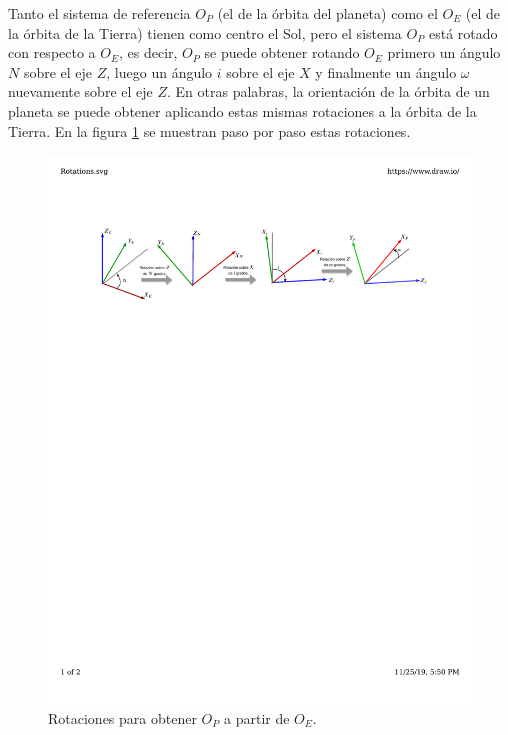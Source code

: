 \documentclass[a4paper,10pt]{article}
\begin{document}
Tanto el sistema de referencia $O_P$ (el de la órbita del planeta) como el $O_E$ (el de la órbita de la Tierra) tienen como centro el Sol, pero el sistema $O_P$ está rotado con respecto a $O_E$, es decir, $O_P$ se puede obtener rotando $O_E$ primero un ángulo $N$ sobre el eje $Z$, luego un ángulo $i$ sobre el eje $X$ y finalmente un ángulo $\omega$ nuevamente sobre el eje $Z$. En otras palabras, la orientación de la órbita de un planeta se puede obtener aplicando estas mismas rotaciones a la órbita de la Tierra. En la figura \ref{fig:Rotations} se muestran paso por paso estas rotaciones.
\begin{figure}
  \centering
  \includegraphics[width=\textwidth]{Figures/Rotations.pdf}
  \caption{Rotaciones para obtener $O_P$ a partir de $O_E$.}
  \label{fig:Rotations}
\end{figure}
\end{document}
